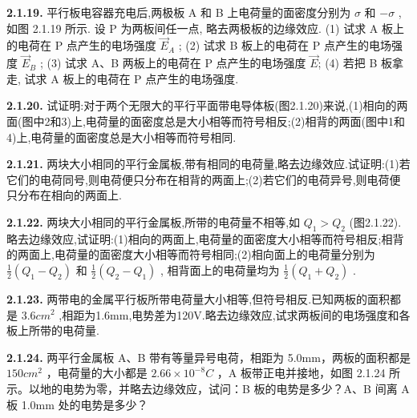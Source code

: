 \vfill
\newpage

\textbf{2.1.19.} 平行板电容器充电后,两极板 A 和 B 上电荷量的面密度分别为 $\sigma$ 和 $-\sigma$ , 如图 2.1.19 所示. 设 P 为两板间任一点, 略去两极板的边缘效应. (1) 试求 A 板上的电荷在 P 点产生的电场强度 $\vec{E}_{A}$ ; (2) 试求 B 板上的电荷在 P 点产生的电场强度 $\vec{E}_{B}$ ; (3) 试求 A、B 两板上的电荷在 P 点产生的电场强度 $\vec{E}$; (4) 若把 B 板拿走, 试求 A 板上的电荷在 P 点产生的电场强度.

\begin{center}
\end{center}

\vfill
\newpage

\textbf{2.1.20.} 试证明:对于两个无限大的平行平面带电导体板(图2.1.20)来说,(1)相向的两面(图中2和3)上,电荷量的面密度总是大小相等而符号相反;(2)相背的两面(图中1和4)上,电荷量的面密度总是大小相等而符号相同.

\vfill
\newpage

\textbf{2.1.21.} 两块大小相同的平行金属板,带有相同的电荷量,略去边缘效应.试证明:(1)若它们的电荷同号,则电荷便只分布在相背的两面上;(2)若它们的电荷异号,则电荷便只分布在相向的两面上.

\vfill
\newpage

\textbf{2.1.22.} 两块大小相同的平行金属板,所带的电荷量不相等,如 $Q_{1} > Q_{2}$ (图2.1.22). 略去边缘效应,试证明:(1)相向的两面上,电荷量的面密度大小相等而符号相反;相背的两面上,电荷量的面密度大小相等而符号相同;(2)相向面上的电荷量分别为 $\displaystyle \frac{1}{2}(Q_1 - Q_2)$ 和 $\displaystyle \frac{1}{2}(Q_2 - Q_1)$ , 相背面上的电荷量均为 $\displaystyle \frac{1}{2}(Q_1 + Q_2)$ .

\begin{center}
\end{center}

\vfill
\newpage

\textbf{2.1.23.} 两带电的金属平行板所带电荷量大小相等,但符号相反.已知两板的面积都是 $3.6cm^{2}$ ,相距为1.6mm,电势差为120V.略去边缘效应,试求两板间的电场强度和各板上所带的电荷量.

\vfill
\newpage

\textbf{2.1.24.} 两平行金属板 A、B 带有等量异号电荷，相距为 5.0mm，两板的面积都是 $150cm^{2}$ ，电荷量的大小都是 $2.66 \times 10^{-8}C$ ，A 板带正电并接地，如图 2.1.24 所示。以地的电势为零，并略去边缘效应，试问：B 板的电势是多少？A、B 间离 A 板 1.0mm 处的电势是多少？

\vfill
\newpage

